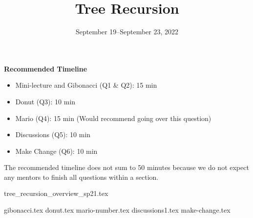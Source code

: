 \documentclass{exam}
\title{Tree Recursion}
\date{September 19--September 23, 2022}
\begin{document}
\maketitle

\begin{meta}
\begin{blocksection}
\textbf{Recommended Timeline}
\begin{itemize}
    \item Mini-lecture and Gibonacci (Q1 \& Q2): 15 min
    \item Donut (Q3): 10 min
    \item Mario (Q4): 15 min (Would recommend going over this question)
    \item Discussions (Q5): 10 min
    \item Make Change (Q6): 10 min
\end{itemize}
The recommended timeline does not sum to 50 minutes because we do not expect any mentors to finish all questions within a section.
\end{blocksection}
\end{meta}

{tree_recursion_overview_sp21.tex}

\begin{questions}
{gibonacci.tex}
{donut.tex}
{mario-number.tex}
{discussions1.tex}
{make-change.tex}



\end{questions}
\end{document}
